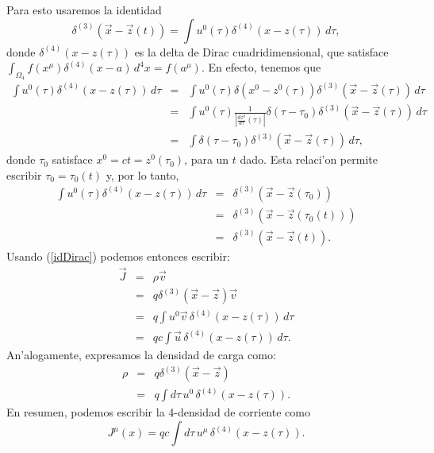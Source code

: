 Para esto usaremos la identidad
\begin{equation}
\boxed{\delta^{(3)}\left(\vec{x}-\vec{z}(t)\right)=\int u^0(\tau)
\delta^{(4)}\left(x-z(\tau)\right)\, d\tau ,} \label{idDirac}
\end{equation}
donde $\delta^{(4)}\left(x-z(\tau)\right)$ es la delta de Dirac
cuadridimensional, que satisface
$\int_{\Omega_4}f(x^\mu)\delta^{(4)}(x-a)\,d^4x=f(a^\mu)$. En efecto, tenemos
que
\begin{eqnarray}
\int u^0(\tau)\delta^{(4)}\left(x-z(\tau)\right)\, d\tau &=&\int
u^0(\tau)\delta(x^0-z^0(\tau))\delta^{(3)}\left(\vec{x}-\vec{z}(\tau)\right)\,
d\tau\\
&=& \int u^0(\tau)\frac{1}{|\frac{dz^0}{d\tau}(\tau)|}\delta(\tau-\tau_0)
\delta^{(3)} \left(\vec {x} -\vec {z } (\tau)\right)\,d\tau \\
&=& \int \delta(\tau-\tau_0) \delta^{(3)} \left(\vec {x} -\vec {z }
(\tau)\right)\,d\tau,
\end{eqnarray}
donde $\tau_0$ satisface $x^0=ct=z^0(\tau_0)$, para un $t$ dado. Esta relaci'on
permite escribir $\tau_0=\tau_0(t)$ y, por lo tanto,
\begin{eqnarray}
\int u^0(\tau)\delta^{(4)}\left(x-z(\tau)\right)\, d\tau &=&
\delta^{(3)}\left(\vec {x} -\vec {z } (\tau_0)\right) \\
&=&\delta^{(3)}\left(\vec {x} -\vec {z}(\tau_0(t))\right)\\
&=&\delta^{(3)}\left(\vec {x} -\vec {z}(t)\right).
\end{eqnarray}
Usando (\ref{idDirac}) podemos entonces escribir:
\begin{eqnarray}
\vec{J}&=&\rho\vec{v}\\
&=&q\delta^{(3)}\left(\vec{x}-\vec{z}\right)\vec{v} \\
&=& q\int u^0\vec{v}\,\delta^{(4)}\left(x-z(\tau)\right)\,d\tau\\
&=& qc\int\vec{u}\,\delta^{(4)}\left(x-z(\tau)\right)\, d\tau .
\end{eqnarray}
An'alogamente, expresamos la densidad de carga como:
\begin{eqnarray}
\rho&=&q\delta^{(3)}\left(\vec{x}-\vec{z}\right) \\
&=& q\int d\tau\, u^0\,\delta^{(4)}\left(x-z(\tau)\right).
\end{eqnarray}
En resumen, podemos escribir la 4-densidad de corriente como
\begin{equation}
\boxed{J^\mu(x)=qc\int d\tau\,
u^\mu\,\delta^{(4)}\left(x-z(\tau)\right).} \label{Jcov}
\end{equation}


